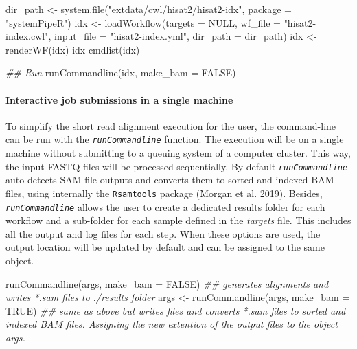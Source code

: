 \documentclass[14pt,]{article}
\newcommand{\hlnum}[1]{\textcolor[rgb]{0.816,0.125,0.439}{#1}}%
\newcommand{\hlstr}[1]{\textcolor[rgb]{0.251,0.627,0.251}{#1}}%
\newcommand{\hlcom}[1]{\textcolor[rgb]{0.502,0.502,0.502}{\textit{#1}}}%
\newcommand{\hlstd}[1]{\textcolor[rgb]{0.251,0.251,0.251}{#1}}%
\newenvironment{Shaded}{\begin{myshaded}}{\end{myshaded}}
\newcommand{\ConstantTok}[1]{\hlnum{#1}}
\newcommand{\StringTok}[1]{\hlstr{#1}}
\newcommand{\DocumentationTok}[1]{\hlcom{#1}}
\newcommand{\OtherTok}[1]{{#1}}
\newcommand{\FunctionTok}[1]{\hlstd{#1}}
\newcommand{\AttributeTok}[1]{{#1}}
\newcommand{\NormalTok}[1]{\hlstd{#1}}
\begin{document}
\begin{Shaded}
\begin{Highlighting}[]
\NormalTok{dir\_path }\OtherTok{\textless{}{-}} \FunctionTok{system.file}\NormalTok{(}\StringTok{"extdata/cwl/hisat2/hisat2{-}idx"}\NormalTok{, }\AttributeTok{package =} \StringTok{"systemPipeR"}\NormalTok{)}
\NormalTok{idx }\OtherTok{\textless{}{-}} \FunctionTok{loadWorkflow}\NormalTok{(}\AttributeTok{targets =} \ConstantTok{NULL}\NormalTok{, }\AttributeTok{wf\_file =} \StringTok{"hisat2{-}index.cwl"}\NormalTok{, }\AttributeTok{input\_file =} \StringTok{"hisat2{-}index.yml"}\NormalTok{, }
    \AttributeTok{dir\_path =}\NormalTok{ dir\_path)}
\NormalTok{idx }\OtherTok{\textless{}{-}} \FunctionTok{renderWF}\NormalTok{(idx)}
\NormalTok{idx}
\FunctionTok{cmdlist}\NormalTok{(idx)}

\DocumentationTok{\#\# Run}
\FunctionTok{runCommandline}\NormalTok{(idx, }\AttributeTok{make\_bam =} \ConstantTok{FALSE}\NormalTok{)}
\end{Highlighting}
\end{Shaded}

\hypertarget{interactive-job-submissions-in-a-single-machine}{%
\paragraph{Interactive job submissions in a single machine}\label{interactive-job-submissions-in-a-single-machine}}

To simplify the short read alignment execution for the user, the command-line
can be run with the \emph{\texttt{runCommandline}} function.
The execution will be on a single machine without submitting to a queuing system
of a computer cluster. This way, the input FASTQ files will be processed sequentially.
By default \emph{\texttt{runCommandline}} auto detects SAM file outputs and converts them
to sorted and indexed BAM files, using internally the \texttt{Rsamtools} package
(Morgan et al. 2019). Besides, \emph{\texttt{runCommandline}} allows the user to create a dedicated
results folder for each workflow and a sub-folder for each sample
defined in the \emph{targets} file. This includes all the output and log files for each
step. When these options are used, the output location will be updated by default
and can be assigned to the same object.

\begin{Shaded}
\begin{Highlighting}[]
\FunctionTok{runCommandline}\NormalTok{(args, }\AttributeTok{make\_bam =} \ConstantTok{FALSE}\NormalTok{)  }\DocumentationTok{\#\# generates alignments and writes *.sam files to ./results folder }
\NormalTok{args }\OtherTok{\textless{}{-}} \FunctionTok{runCommandline}\NormalTok{(args, }\AttributeTok{make\_bam =} \ConstantTok{TRUE}\NormalTok{)  }\DocumentationTok{\#\# same as above but writes files and converts *.sam files to sorted and indexed BAM files. Assigning the new extention of the output files to the object args.}
\end{Highlighting}
\end{Shaded}
\end{document}

